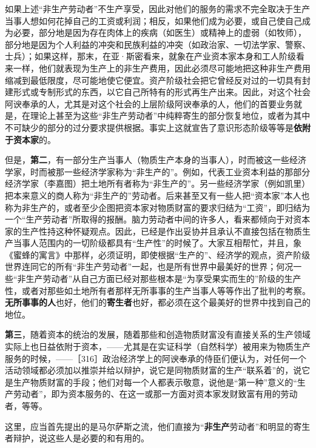 如果上述“非生产劳动者”不生产享受，因此对他们的服务的需求不完全取决于生产当事人想如何花掉自己的工资或利润；相反，如果他们成为必要，或自己使自己成为必要，部分地是因为存在肉体上的疾病（如医生）或精神上的虚弱（如牧师），部分地是因为个人利益的冲突和民族利益的冲突（如政治家、一切法学家、警察、士兵）；如果这样，那末，在亚·斯密看来，就象在产业资本家本身和工人阶级看来一样，他们就表现为生产上的非生产费用，因此必须尽可能地把这种非生产费用缩减到最低限度，尽可能地使它便宜。资产阶级社会把它曾经反对过的一切具有封建形式或专制形式的东西，以它自己所特有的形式再生产出来。因此，对这个社会阿谀奉承的人，尤其是对这个社会的上层阶级阿谀奉承的人，他们的首要业务就是，在理论上甚至为这些“非生产劳动者”中纯粹寄生的部分恢复地位，或者为其中不可缺少的部分的过分要求提供根据。事实上这就宣告了意识形态阶级等等是\textbf{依附于资本家}的。

但是，\textbf{第二}，有一部分生产当事人（物质生产本身的当事人），时而被这一些经济学家，时而被那一些经济学家称为“非生产的”。例如，代表工业资本利益的那部分经济学家（李嘉图）把土地所有者称为“非生产的”。另一些经济学家（例如凯里）把本来意义的商人称为“非生产的”劳动者。后来甚至又有一些人把“资本家”本人也称为非生产的，或者至少企图把资本家对物质财富的要求归结为“工资”，即归结为一个“生产劳动者”所取得的报酬。脑力劳动者中间的许多人，看来都倾向于对资本家的生产性持这种怀疑观点。因此，已经是作出妥协并且承认不直接包括在物质生产当事人范围内的一切阶级都具有“生产性”的时候了。大家互相帮忙，并且，象《蜜蜂的寓言》中那样，必须证明，即使根据“生产的”、经济学的观点，资产阶级世界连同它的所有“非生产劳动者”一起，也是所有世界中最美好的世界；何况一些“非生产劳动者”从自己方面已经对那些根本是“为享受果实而生的”阶级的生产性，或者对那些如土地所有者那样无所事事的生产当事人等等作出了批判的考察。\textbf{无所事事的人}也好，他们的\textbf{寄生者}也好，都必须在这个最美好的世界中找到自己的地位。

\textbf{第三}，随着资本的统治的发展，随着那些和创造物质财富没有直接关系的生产领域实际上也日益依附于资本，——尤其是在实证科学（自然科学）被用来为物质生产服务的时候，——［316］政治经济学上的阿谀奉承的侍臣们便认为，对任何一个活动领域都必须加以推崇并给以辩护，说它是同物质财富的生产“联系着”的，说它是生产物质财富的手段；他们对每一个人都表示敬意，说他是“第一种”意义的“生产劳动者”，即为资本服务的、在这一或那一方面对资本家发财致富有用的劳动者，等等。

这里，应当首先提出的是马尔萨斯之流，他们直接为“\textbf{非生产}劳动者”和明显的寄生者辩护，说这些人是必要的和有用的。

